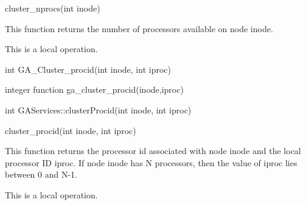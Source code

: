 \documentclass[12pt]{article}
\begin{document}
\begin{pyapi}
\begin{pycode}
cluster_nprocs(int inode) 
\end{pycode}
\end{pyapi}
\local

\begin{desc}

This function returns the number of processors available on node inode.

This is a local operation.
\end{desc}


\begin{capi}
\begin{ccode}
int GA_Cluster_procid(int inode, int iproc)
\end{ccode}
\begin{funcargs}
\end{funcargs}
\end{capi}

\begin{fapi}
\begin{fcode}
integer function ga_cluster_procid(inode,iproc)
\end{fcode}
\begin{funcargs}
\end{funcargs}
\end{fapi}

\begin{cxxapi}
\begin{cxxcode}
int GAServices::clusterProcid(int inode, int iproc)
\end{cxxcode}
\begin{funcargs}
\end{funcargs}
\end{cxxapi}

\begin{pyapi}
\begin{pycode}
cluster_procid(int inode, int iproc)  
\end{pycode}
\end{pyapi} 

\local

\begin{desc}

This function returns the processor id associated with node inode and 
the local processor ID iproc. If node inode has N processors, then the 
value of iproc lies between 0 and N-1.

This is a local operation.
\end{desc}
\end{document}
